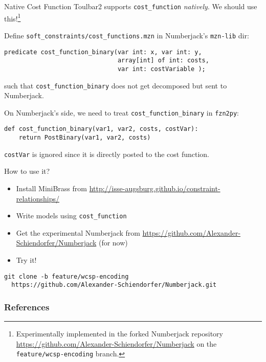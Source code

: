 \documentclass[handout,10pt,xcolor={dvipsnames},fleqn]{beamer}
\begin{document}
\begin{frame}[fragile]{Native Cost Function} \small
Toulbar2 supports \texttt{cost\_function} \emph{natively}. We should use this!\footnote{Experimentally
implemented in the forked Numberjack repository \url{https://github.com/Alexander-Schiendorfer/Numberjack} on the \texttt{feature/wcsp-encoding} branch.}

\vspace*{2ex}

Define \texttt{soft\_constraints/cost\_functions.mzn} in Numberjack's \texttt{mzn-lib} dir:
\begin{lstlisting}
predicate cost_function_binary(var int: x, var int: y, 
                               array[int] of int: costs, 
                               var int: costVariable );
\end{lstlisting}
such that \texttt{cost\_function\_binary} does not get decomposed but sent to Numberjack.

\vspace*{2ex}
On Numberjack's side, we need to treat \texttt{cost\_function\_binary} in \texttt{fzn2py}:
\lstset{language=python}
\begin{lstlisting}
def cost_function_binary(var1, var2, costs, costVar):
    return PostBinary(var1, var2, costs)
\end{lstlisting}
\lstset{language=mzn}
\texttt{costVar} is ignored since it is directly posted to the cost function.
\end{frame}

\begin{frame}[fragile]{How to use it?} \small
\begin{itemize}
\item Install MiniBrass from \url{http://isse-augsburg.github.io/constraint-relationships/}
\item Write models using \texttt{cost\_function}
\item Get the experimental Numberjack from \url{https://github.com/Alexander-Schiendorfer/Numberjack} (for now)
\item Try it!
\end{itemize}
\begin{lstlisting}
git clone -b feature/wcsp-encoding 
  https://github.com/Alexander-Schiendorfer/Numberjack.git 
\end{lstlisting}
\end{frame}

\begin{frame}[allowframebreaks]
        \frametitle{References}
        
        
\end{frame}
\end{document}

